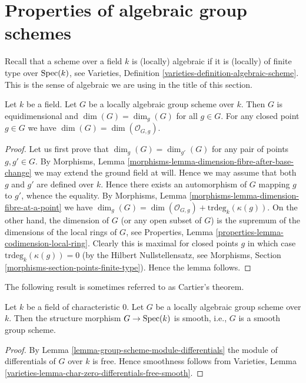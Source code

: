 \section{Properties of algebraic group schemes}
\label{section-algebraic-group-schemes}

\noindent
Recall that a scheme over a field $k$ is (locally) algebraic if it is
(locally) of finite type over $\mathop{\mathrm{Spec}}(k)$, see
Varieties, Definition \ref{varieties-definition-algebraic-scheme}.
This is the sense of algebraic we are using in the title of this section.

\begin{lemma}
\label{lemma-group-scheme-finite-type-field}
Let $k$ be a field. Let $G$ be a locally algebraic group scheme over $k$.
Then $G$ is equidimensional and $\dim(G) = \dim_g(G)$ for all $g \in G$.
For any closed point $g \in G$ we have $\dim(G) = \dim(\mathcal{O}_{G, g})$.
\end{lemma}

\begin{proof}
Let us first prove that $\dim_g(G) = \dim_{g'}(G)$ for any
pair of points $g, g' \in G$. By
Morphisms, Lemma \ref{morphisms-lemma-dimension-fibre-after-base-change}
we may extend the ground field at will. Hence we may assume that
both $g$ and $g'$ are defined over $k$. Hence there exists an
automorphism of $G$ mapping $g$ to $g'$, whence the equality.
By
Morphisms, Lemma \ref{morphisms-lemma-dimension-fibre-at-a-point}
we have
$\dim_g(G) = \dim(\mathcal{O}_{G, g}) +
\text{trdeg}_k(\kappa(g))$.
On the other hand, the dimension of $G$ (or any open subset of $G$)
is the supremum of the dimensions of the local rings of $G$, see
Properties, Lemma \ref{properties-lemma-codimension-local-ring}.
Clearly this is maximal for closed points $g$ in which case
$\text{trdeg}_k(\kappa(g)) = 0$ (by the Hilbert Nullstellensatz, see
Morphisms, Section \ref{morphisms-section-points-finite-type}).
Hence the lemma follows.
\end{proof}

\noindent
The following result is sometimes referred to as Cartier's theorem.

\begin{lemma}
\label{lemma-group-scheme-characteristic-zero-smooth}
Let $k$ be a field of characteristic $0$. Let $G$ be a
locally algebraic group scheme over $k$. Then the structure
morphism $G \to \mathop{\mathrm{Spec}}(k)$ is smooth, i.e., $G$ is a smooth
group scheme.
\end{lemma}

\begin{proof}
By
Lemma \ref{lemma-group-scheme-module-differentials}
the module of differentials of $G$ over $k$ is free.
Hence smoothness follows from
Varieties, Lemma \ref{varieties-lemma-char-zero-differentials-free-smooth}.
\end{proof}


